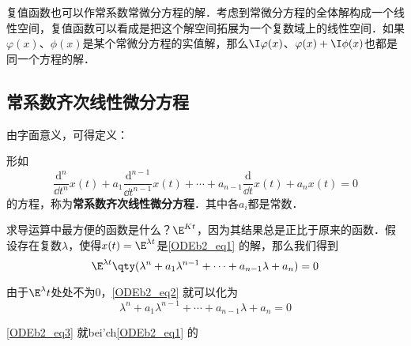 复值函数也可以作常系数常微分方程的解．考虑到常微分方程的全体解构成一个线性空间，复值函数可以看成是把这个解空间拓展为一个复数域上的线性空间．如果$\varphi(x)$、$\phi(x)$是某个常微分方程的实值解，那么$\I\varphi(x)$、$\varphi(x)+\I \phi(x)$也都是同一个方程的解．


\subsection{常系数齐次线性微分方程}

由字面意义，可得定义：
\begin{definition}{}
形如
\begin{equation}\label{ODEb2_eq1}
\frac{\mathrm{d}^n}{\dd t^n}x(t)+a_1\frac{\mathrm{d}^{n-1}}{\dd t^{n-1}}x(t)+\cdots+a_{n-1}\frac{\mathrm{d}}{\dd t}x(t)+a_nx(t)=0
\end{equation}
的方程，称为\textbf{常系数齐次线性微分方程}．其中各$a_i$都是常数．
\end{definition}

求导运算中最方便的函数是什么？$\E^{Kt}$，因为其结果总是正比于原来的函数．假设存在复数$\lambda$，使得$x(t)=\E^{\lambda t}$是\autoref{ODEb2_eq1} 的解，那么我们得到
\begin{equation}\label{ODEb2_eq2}
\E^{\lambda t}\qty(\lambda^n+a_1\lambda^{n-1}+\cdots+a_{n-1}\lambda+a_n)=0
\end{equation}

由于$\E^\lambda t$处处不为$0$，\autoref{ODEb2_eq2} 就可以化为
\begin{equation}\label{ODEb2_eq3}
\lambda^n+a_1\lambda^{n-1}+\cdots+a_{n-1}\lambda+a_n=0
\end{equation}

\autoref{ODEb2_eq3} 就bei'ch\autoref{ODEb2_eq1} 的





























